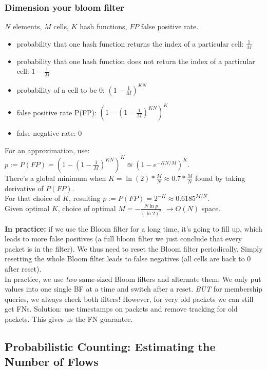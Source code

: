 \subsubsection{Dimension your bloom filter}
\label{bloom_filter_dimension}

$N$ elements, $M$ cells, $K$ hash functions, $FP$ false positive rate.

\begin{itemize}
	\item probability that one hash function returns the index of a particular cell: $\frac{1}{M}$
	\item probability that one hash function does not return the index of a particular cell: $1 - \frac{1}{M}$
	\item probability of a cell to be 0: $(1 - \frac{1}{M})^{KN}$
	\item false positive rate P(FP): $(1 - (1 - \frac{1}{M})^{KN})^K$
	\item false negative rate: 0
\end{itemize}

For an approximation, use: $p := P(FP) = (1 - (1 - \frac{1}{M})^{KN})^K \approxeq (1 - e^{-KN/M})^K$.\\

There's a global minimum when $K = \ln(2) * \frac{M}{N}  \approx 0.7*\frac{M}{N}$ found by taking derivative of $P(FP)$.\\
For that choice of $K$, resulting $p := P(FP) = 2^{-K} \approx 0.6185^{M/N}$.\\
Given optimal $K$, choice of optimal $M = -\frac{N \ln p}{(\ln2)^2}$ $\rightarrow O(N)$ space.

\textbf{In practice:} if we use the Bloom filter for a long time, it's going to fill up, which leads to more false positives (a full bloom filter we just conclude that every packet is in the filter). We thus need to reset the Bloom filter periodically. Simply resetting the whole Bloom filter leads to false negatives (all cells are back to 0 after reset).\\
In practice, we use \textit{two} same-sized Bloom filters and alternate them. We only put values into one single BF at a time and switch after a reset. \textit{BUT} for membership queries, we always check both filters! However, for very old packets we can still get FNs. Solution: use timestamps on packets and remove tracking for old packets. This gives us the FN guarantee.

\subsection{Probabilistic Counting: Estimating the Number of Flows}

